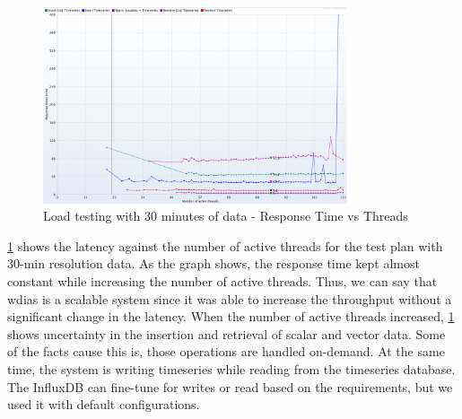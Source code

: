 \begin{figure}[htp]
    \centering
    \includegraphics[width=0.8\textwidth]{results/obs/all/obs_all_30m_response_times_vs_threads.png}
    \caption{Load testing with 30 minutes of data - Response Time vs Threads}
    \label{fi:test_obs_all_30m_response_vs_threads}
\end{figure}

\cref{fi:test_obs_all_30m_response_vs_threads} shows the latency against the number of active threads for the test plan with 30-min resolution data. As the graph shows, the response time kept almost constant while increasing the number of active threads. Thus, we can say that \acrshort{wdias} is a scalable system since it was able to increase the throughput without a significant change in the latency. When the number of active threads increased, \cref{fi:test_obs_all_30m_response_vs_threads} shows uncertainty in the insertion and retrieval of scalar and vector data. Some of the facts cause this is, those operations are handled on-demand. At the same time, the system is writing timeseries while reading from the timeseries database. The InfluxDB can fine-tune for writes or read based on the requirements, but we used it with default configurations.

